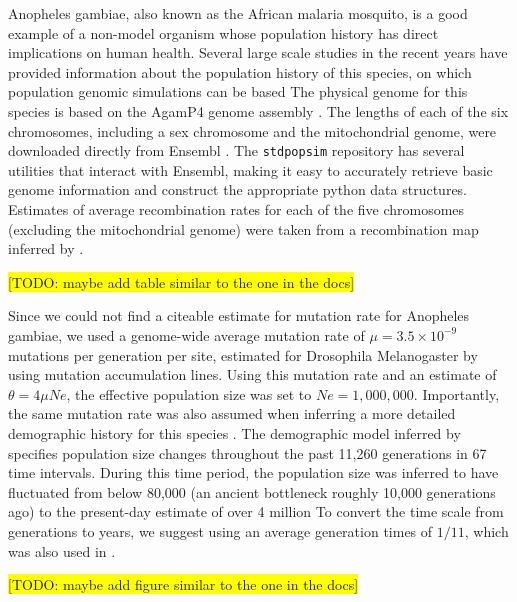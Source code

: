 \documentclass[hidelinks]{article}
\newcommand{\stdpopsim}{\texttt{stdpopsim}\xspace}
\begin{document}
Anopheles gambiae, also known as the African malaria mosquito, is a good example
of a non-model organism whose population history has direct implications on human health.
Several large scale studies in the recent years have provided information about the
population history of this species, on which population genomic simulations can be based \citep[e.g.,][]{Miles2017, clarkson2020genome}
The physical genome for this species is based on the AgamP4 genome assembly \citep{Sharakhova2007}. 
The lengths of each of the six chromosomes, including a sex chromosome and the mitochondrial genome, 
were downloaded directly from Ensembl \citep{ensembl2021}.
The \texttt{\stdpopsim} repository has several utilities that interact with Ensembl, 
making it easy to accurately retrieve basic genome information and construct the appropriate python data structures.
Estimates of average recombination rates for each of the five chromosomes (excluding the mitochondrial genome) 
were taken from a recombination map inferred by \cite{Pombi2006}.


\colorbox{yellow}{[TODO:  maybe add table similar to the one in the docs]} 

Since we could not find a citeable estimate for mutation rate for Anopheles gambiae, we used a genome-wide average mutation rate of $\mu=3.5 \times 10^{-9}$ mutations per generation per site, estimated for Drosophila Melanogaster by \cite{Keightley2009} using mutation accumulation lines. Using this mutation rate and an estimate of $\theta=4\mu Ne$, the effective population size was set to $Ne=1,000,000$.
%
Importantly, the same mutation rate was also assumed when inferring a more detailed demographic history for this species \citep{Miles2017}. The demographic model inferred by \cite{Miles2017} specifies population size changes throughout the past 11,260 generations in 67 time intervals. During this time period, the population size was inferred to have fluctuated from below 80,000 (an ancient bottleneck roughly 10,000 generations ago) to the present-day estimate of over 4 million %
To convert the time scale from generations to years, we suggest using an average generation times of $1/11$, which was also used in \citep{Miles2017}.

\colorbox{yellow}{[TODO:  maybe add figure similar to the one in the docs]} 

\end{document}
